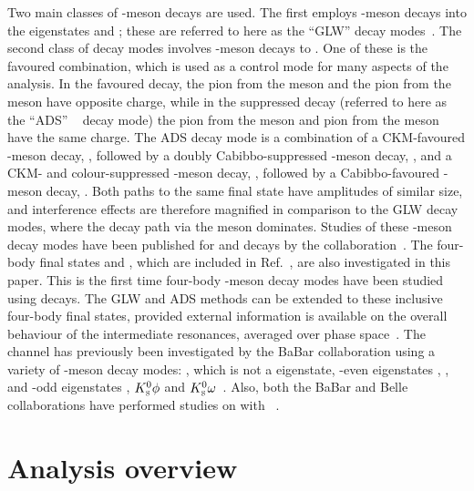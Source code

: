 Two main classes of \D-meson decays are used. The first employs \D-meson decays into the \CP eigenstates \Kp\Km and \pip\pim; these are referred to here as the ``GLW'' decay modes~\cite{GL,GW}. The second class of decay modes involves \D-meson decays to \Kmp\pipm. One of these is the favoured combination, which is used as a control mode for many aspects of the analysis. In the favoured decay, the pion from the \D meson and the pion from the \Kstarm meson have opposite charge, while in the suppressed decay (referred to here as the ``ADS'' ~\cite{ADS,ADS-2001} decay mode) the pion from the \D meson and pion from the \Kstarm meson have the same charge. The ADS decay mode is a combination of a CKM-favoured \B-meson decay, \decay{\Bm}{\Dz\Kstarm}, followed by a doubly Cabibbo-suppressed \D-meson decay, \decay{\Dz}{\Kp\pim}, and a CKM- and colour-suppressed \B-meson decay, \decay{\Bm}{\Dzb\Kstarm}, followed by a Cabibbo-favoured \D-meson decay, \decay{\Dzb}{\Kp\pim}. Both paths to the same final state have amplitudes of similar size, and interference effects are therefore magnified in comparison to the GLW decay modes, where the decay path via the \Dz meson dominates. Studies of these \D-meson decay modes have been published for  and \decay{\Bz}{\D\Kstarz} decays by the \lhcb collaboration~\cite{LHCB-PAPER-2016-003, LHCB-PAPER-2014-028}. The four-body final states \decay{\D}{\Kmp\pipm\pimp\pipm} and \decay{\D}{\pip\pim\pip\pim}, which are included in Ref.~\cite{LHCB-PAPER-2016-003}, are also investigated in this paper. This is the first time four-body \D-meson decay modes have been studied using \decay{\Bm}{\D\Kstarm} decays. The GLW and ADS methods can be extended to these inclusive four-body final states, provided external information is available on the overall behaviour of the intermediate resonances, averaged over phase space~\cite{charminfo,charm4pi}. The \decay{\Bm}{\D\Kstarm} channel has previously been investigated by the BaBar collaboration using a variety of \D-meson  decay modes: \Km\pip, which is not a \CP eigenstate, \CP-even eigenstates \Kp\Km, \pip\pim, and \CP-odd eigenstates \KS\piz, ${{K}^0_{\mathrm{ \scriptscriptstyle S}}}\phi$ and ${{K}^0_{\mathrm{ \scriptscriptstyle S}}}\omega$~\cite{BaBarDKstar}. 
Also, both the BaBar and Belle collaborations have performed studies on \decay{\Bm}{\D\Kstarm} with \decay{\D}{\KS\pip\pim}~\cite{BaBarGGSZ,BelleGGSZ}.

\section{Analysis overview}
